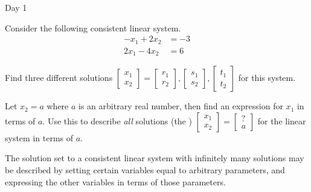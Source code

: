 \begin{applicationActivities}{Day 1}
\begin{activity}{10}
  Consider the following consistent linear system.
  \begin{align*}
  -x_1+2x_2  &= -3 \\
  2x_1-4x_2  &=  6
  \end{align*}
\begin{subactivity}
  Find three different solutions
  \(
    \begin{bmatrix}
      x_1 \\
      x_2
    \end{bmatrix}=
    \begin{bmatrix}
      r_1 \\
      r_2
    \end{bmatrix},
    \begin{bmatrix}
      s_1 \\
      s_2
    \end{bmatrix},
    \begin{bmatrix}
      t_1 \\
      t_2
    \end{bmatrix}
  \)
  for this system.
\end{subactivity}
\begin{subactivity}
  Let \(x_2=a\) where \(a\) is an arbitrary real number, then find an
  expression for \(x_1\) in terms of \(a\). Use this to describe \textit{all}
  solutions (the )
  \(
    \begin{bmatrix}
      x_1 \\
      x_2
    \end{bmatrix}=
    \begin{bmatrix}
      ? \\
      a
    \end{bmatrix}
  \)
  for the linear system in terms of \(a\).
\end{subactivity}
\end{activity}

\begin{remark}
  The solution set to a consistent linear system with infinitely many solutions
  may be described by setting
  certain variables equal to arbitrary parameters, and expressing the
  other variables in terms of those parameters.
\end{remark}


\end{applicationActivities}
